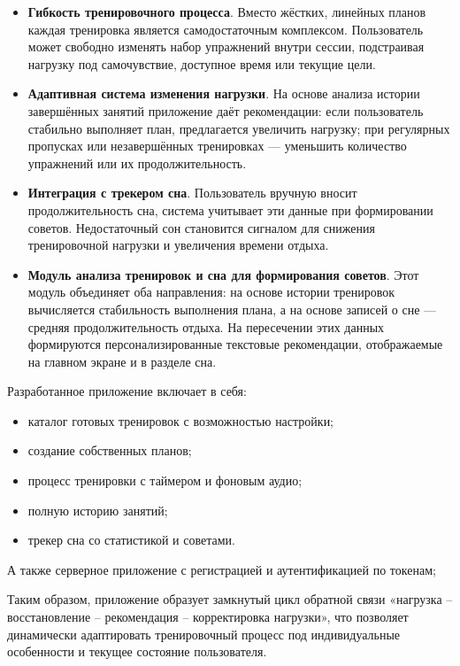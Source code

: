 \begin{itemize}
    \item \textbf{Гибкость тренировочного процесса}. Вместо жёстких, линейных планов каждая тренировка является самодостаточным комплексом. Пользователь может свободно изменять набор упражнений внутри сессии, подстраивая нагрузку под самочувствие, доступное время или текущие цели.
    
    \item \textbf{Адаптивная система изменения нагрузки}. На основе анализа истории завершённых занятий приложение даёт рекомендации: если пользователь стабильно выполняет план, предлагается увеличить нагрузку; при регулярных пропусках или незавершённых тренировках — уменьшить количество упражнений или их продолжительность.
    
    \item \textbf{Интеграция с трекером сна}. Пользователь вручную вносит продолжительность сна, система учитывает эти данные при формировании советов. Недостаточный сон становится сигналом для снижения тренировочной нагрузки и увеличения времени отдыха.
    
    \item \textbf{Модуль анализа тренировок и сна для формирования советов}. Этот модуль объединяет оба направления: на основе истории тренировок вычисляется стабильность выполнения плана, а на основе записей о сне — средняя продолжительность отдыха. На пересечении этих данных формируются персонализированные текстовые рекомендации, отображаемые на главном экране и в разделе сна.
\end{itemize}

Разработанное приложение включает в себя:
\begin{itemize}
    \item каталог готовых тренировок с возможностью настройки;
    \item создание собственных планов;
    \item процесс тренировки с таймером и фоновым аудио;
    \item полную историю занятий;
    \item трекер сна со статистикой и советами.
\end{itemize}

А также серверное приложение с регистрацией и аутентификацией по токенам;

Таким образом, приложение образует замкнутый цикл обратной связи «нагрузка – восстановление – рекомендация – корректировка нагрузки», что позволяет динамически адаптировать тренировочный процесс под индивидуальные особенности и текущее состояние пользователя.